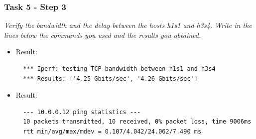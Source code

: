 \subsubsection*{Task 5 - Step 3}
\textit{Verify the bandwidth and the delay between the hosts h1s1 and h3s4. Write
in the lines below the commands you used and the results you obtained.}
\begin{itemize}
  \item {}

  Result:
  \begin{lstlisting}
  *** Iperf: testing TCP bandwidth between h1s1 and h3s4
  *** Results: ['4.25 Gbits/sec', '4.26 Gbits/sec']
  \end{lstlisting}

  \item {}

  Result:
  \begin{lstlisting}
  --- 10.0.0.12 ping statistics ---
  10 packets transmitted, 10 received, 0% packet loss, time 9006ms
  rtt min/avg/max/mdev = 0.107/4.042/24.062/7.490 ms
  \end{lstlisting}
\end{itemize}
